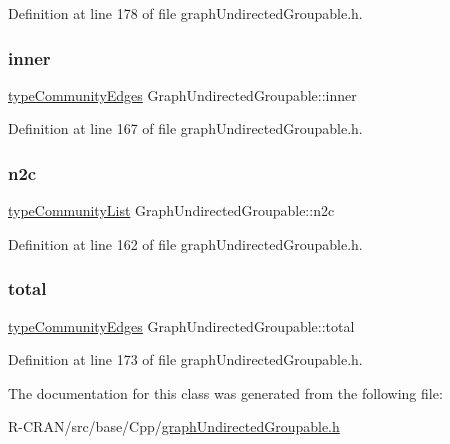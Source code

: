 Definition at line 178 of file graph\+Undirected\+Groupable.\+h.

\mbox{\label{classGraphUndirectedGroupable_a5c8f0f0af49f33dbdbdcafe582a4e3ab}} 
\subsubsection{\texorpdfstring{inner}{inner}}
{\footnotesize\ttfamily \hyperlink{graphUndirectedGroupable_8h_abd93e760650a385346e55346b8c4bbb2}{type\+Community\+Edges} Graph\+Undirected\+Groupable\+::inner\hspace{0.3cm}{\ttfamily [private]}}



Definition at line 167 of file graph\+Undirected\+Groupable.\+h.

\mbox{\label{classGraphUndirectedGroupable_a882c6d9efd31f3b61df38a2daccc349f}} 
\subsubsection{\texorpdfstring{n2c}{n2c}}
{\footnotesize\ttfamily \hyperlink{graphUndirectedGroupable_8h_a8d8ff0ef0315e7cd3b62e467487cd0e1}{type\+Community\+List} Graph\+Undirected\+Groupable\+::n2c\hspace{0.3cm}{\ttfamily [private]}}



Definition at line 162 of file graph\+Undirected\+Groupable.\+h.

\mbox{\label{classGraphUndirectedGroupable_a0f7cf3e9679f92d817efc208ae5710c4}} 
\subsubsection{\texorpdfstring{total}{total}}
{\footnotesize\ttfamily \hyperlink{graphUndirectedGroupable_8h_abd93e760650a385346e55346b8c4bbb2}{type\+Community\+Edges} Graph\+Undirected\+Groupable\+::total\hspace{0.3cm}{\ttfamily [private]}}



Definition at line 173 of file graph\+Undirected\+Groupable.\+h.



The documentation for this class was generated from the following file\+:\begin{DoxyCompactItemize}
\item 
R-\/\+C\+R\+A\+N/src/base/\+Cpp/\hyperlink{graphUndirectedGroupable_8h}{graph\+Undirected\+Groupable.\+h}\end{DoxyCompactItemize}
